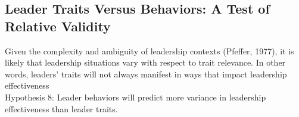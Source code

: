 \subsection{Leader Traits Versus Behaviors: A Test of Relative Validity} %
\label{sub:leader_traits_versus_behaviors_a_test_of_relative_validity}
	Given the complexity and ambiguity of leadership contexts (Pfeffer, 1977), it is likely that leadership situations vary with respect to trait relevance. In other words, leaders’ traits will not always manifest in ways that impact leadership effectiveness
	\\Hypothesis 8: Leader behaviors will predict more variance in leadership effectiveness than leader traits.

